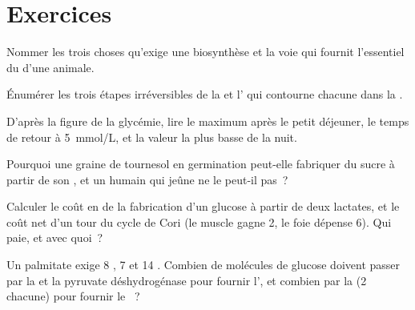 \section{Exercices}

\begin{exercise}[$\star$]\label{exo:b1:biosyntheses-integration:1}
Nommer les trois choses qu'exige une biosynthèse et la voie qui fournit
l'essentiel du  d'une  animale.
\end{exercise}

\begin{exercise}[$\star$]\label{exo:b1:biosyntheses-integration:2}
Énumérer les trois étapes irréversibles de la  et l' qui
contourne chacune dans la .
\end{exercise}

\begin{exercise}[$\star$]\label{exo:b1:biosyntheses-integration:3}
D'après la figure de la glycémie, lire le maximum après le petit
déjeuner, le temps de retour à \qty{5}{mmol/L}, et la valeur la plus
basse de la nuit.
\end{exercise}

\begin{exercise}[$\star$]\label{exo:b1:biosyntheses-integration:4}
Pourquoi une graine de tournesol en germination peut-elle fabriquer du
sucre à partir de son , et un humain qui jeûne ne le peut-il pas~?
\end{exercise}

\begin{exercise}[$\star\star$]\label{exo:b1:biosyntheses-integration:5}
Calculer le coût en  de la fabrication d'un glucose à partir de deux
lactates, et le coût net d'un tour du cycle de Cori (le muscle gagne 2,
le foie dépense 6). Qui paie, et avec quoi~?
\end{exercise}

\begin{exercise}[$\star\star$]\label{exo:b1:biosyntheses-integration:6}
Un palmitate exige 8 , 7  et 14 . Combien de
molécules de glucose doivent passer par la  et la pyruvate
déshydrogénase pour fournir l', et combien par la  (2  chacune) pour fournir le ~?
\end{exercise}

